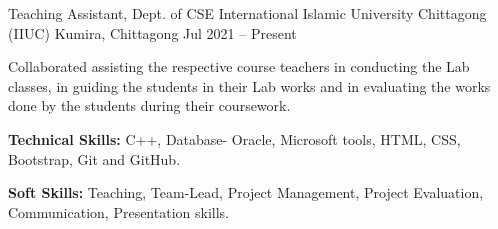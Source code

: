 

\begin{cventries}

  \cventry
    {Teaching Assistant, Dept. of CSE} %
    {International Islamic University Chittagong (IIUC)} %
    {Kumira, Chittagong} %
    {Jul 2021 – Present} %
    {
      \begin{cvitems} %
        \item {Collaborated assisting the respective course teachers in conducting the Lab classes, in guiding the students in their Lab works and in evaluating the works done by the students during their coursework.}
        \item {\textbf{Technical Skills:} C++, Database- Oracle, Microsoft tools, HTML, CSS, Bootstrap, Git and GitHub.}
        \item {\textbf{Soft Skills:} Teaching, Team-Lead, Project Management, Project Evaluation, Communication, Presentation skills.}
      \end{cvitems}
    }


\end{cventries}

